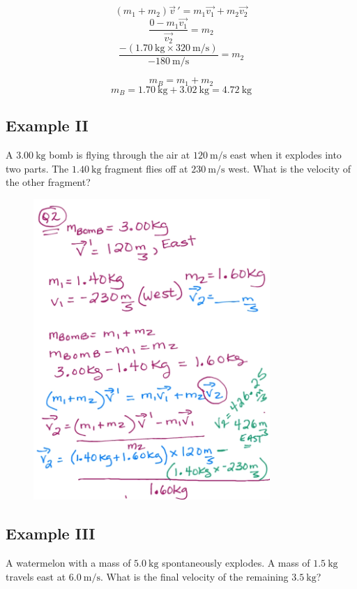 \documentclass[a4paper,12pt]{article}
\begin{document}
$$(m_1 + m_2)\vec{v}\,' = m_1\vec{v_1} + m_2\vec{v_2}$$
$$\frac{0 - m_1\vec{v_1}}{\vec{v_2}} = m_2$$
$$\frac{-(\SI{1.70}{\kg} \times \SI{320}{\m/\s})}{\SI{-180}{\m/\s}} = m_2$$

$$m_B = m_1 + m_2$$
$$m_B = \SI{1.70}{\kg} + \SI{3.02}{\kg} = \SI{4.72}{\kg}$$

\pagebreak

\subsection{Example II}
A $\SI{3.00}{\kg}$ bomb is flying through the air at $\SI{120}{\m/\s}$ east when it explodes into two parts. The $\SI{1.40}{\kg}$ fragment flies off at $\SI{230}{\m/\s}$ west. What is the velocity of the other fragment?

\begin{figure}[H]
    \centering
    \includegraphics[width=0.8\textwidth]{q-explode-2}
\end{figure}

\pagebreak

\subsection{Example III}
A watermelon with a mass of $\SI{5.0}{\kg}$ spontaneously explodes. A mass of $\SI{1.5}{\kg}$ travels east at $\SI{6.0}{\m/\s}$. What is the final velocity of the remaining $\SI{3.5}{\kg}$? 
\end{document}
